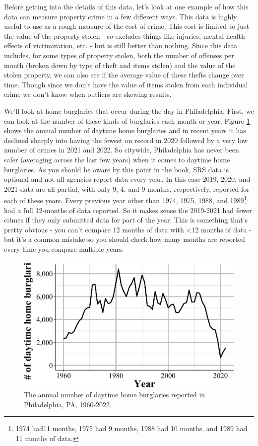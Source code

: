 \documentclass[
  12pt,
  openany]{book}
\begin{document}
Before getting into the details of this data, let's look at one example of how this data can measure property crime in a few different ways. This data is highly useful to use as a rough measure of the cost of crime. This cost is limited to just the value of the property stolen - so excludes things like injuries, mental health effects of victimization, etc. - but is still better than nothing. Since this data includes, for some types of property stolen, both the number of offenses per month (broken down by type of theft and items stolen) and the value of the stolen property, we can also see if the average value of these thefts change over time. Though since we don't have the value of items stolen from each individual crime we don't know when outliers are skewing results.

We'll look at home burglaries that occur during the day in Philadelphia. First, we can look at the number of these kinds of burglaries each month or year. Figure \ref{fig:phillyHomeBurglaryCount} shows the annual number of daytime home burglaries and in recent years it has declined sharply into having the fewest on record in 2020 followed by a very low number of crimes in 2021 and 2022. So citywide, Philadelphia has never been safer (averaging across the last few years) when it comes to daytime home burglaries. As you should be aware by this point in the book, SRS data is optional and not all agencies report data every year. In this case 2019, 2020, and 2021 data are all partial, with only 9, 4, and 9 months, respectively, reported for each of these years. Every previous year other than 1974, 1975, 1988, and 1989\footnote{1974 had11 months, 1975 had 9 months, 1988 had 10 months, and 1989 had 11 months of data.} had a full 12-months of data reported. So it makes sense the 2019-2021 had fewer crimes if they only submitted data for part of the year. This is something that's pretty obvious - you can't compare 12 months of data with \textless12 months of data - but it's a common mistake so you should check how many months are reported every time you compare multiple years.

\begin{figure}

{\centering \includegraphics[width=0.9\linewidth]{04_stolen_property_files/figure-latex/phillyHomeBurglaryCount-1} 

}

\caption{The annual number of daytime home burglaries reported in Philadelphia, PA, 1960-2022.}\label{fig:phillyHomeBurglaryCount}
\end{figure}
\end{document}
